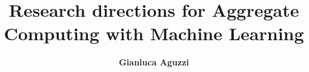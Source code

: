 \title{Research directions for Aggregate Computing with
Machine Learning}
\author[G.Aguzzi]{
  \textbf{Gianluca Aguzzi}
}
